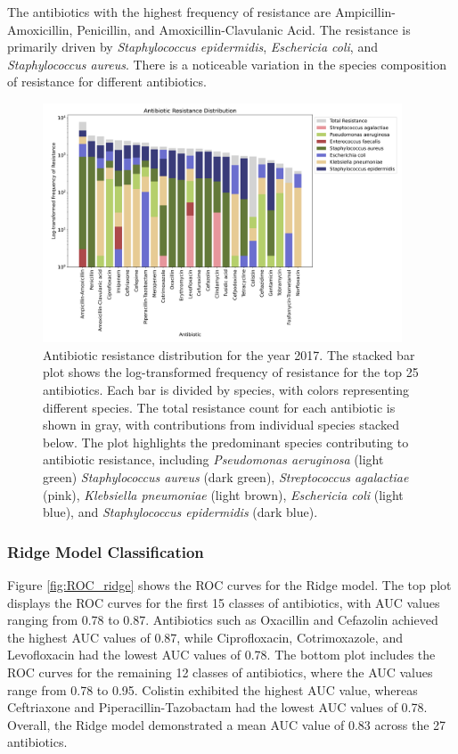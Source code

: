 \documentclass[english,11pt,a4paper,titlepage]{article}
\begin{document}
The antibiotics with the highest frequency of resistance are Ampicillin-Amoxicillin, Penicillin, and Amoxicillin-Clavulanic Acid. The resistance is primarily driven by \textit{Staphylococcus epidermidis}, \textit{Eschericia coli}, and \textit{Staphylococcus aureus}. There is a noticeable variation in the species composition of resistance for different antibiotics.

\begin{figure}[h]
	\centering
	\includegraphics[width=0.95\textwidth]{img/antibiotic_resistance_distribution_filtered_2017.png}
	\caption{Antibiotic resistance distribution for the year 2017. The stacked bar plot shows the log-transformed frequency of resistance for the top 25 antibiotics. Each bar is divided by species, with colors representing different species. The total resistance count for each antibiotic is shown in gray, with contributions from individual species stacked below. The plot highlights the predominant species contributing to antibiotic resistance, including \textit{Pseudomonas aeruginosa} (light green) \textit{Staphylococcus aureus} (dark green), \textit{Streptococcus agalactiae} (pink), \textit{Klebsiella pneumoniae} (light brown), \textit{Eschericia coli} (light blue), and \textit{Staphylococcus epidermidis} (dark blue).}
	\label{fig:antibiotic_resistance_distribution}
\end{figure}

\subsubsection*{Ridge Model Classification}
Figure \ref{fig:ROC_ridge} shows the ROC curves for the Ridge model. The top plot displays the ROC curves for the first 15 classes of antibiotics, with AUC values ranging from 0.78 to 0.87. Antibiotics such as Oxacillin and Cefazolin achieved the highest AUC values of 0.87, while Ciprofloxacin, Cotrimoxazole, and Levofloxacin had the lowest AUC values of 0.78. The bottom plot includes the ROC curves for the remaining 12 classes of antibiotics, where the AUC values range from 0.78 to 0.95. Colistin exhibited the highest AUC value, whereas Ceftriaxone and Piperacillin-Tazobactam had the lowest AUC values of 0.78. Overall, the Ridge model demonstrated a mean AUC value of 0.83 across the 27 antibiotics.
\end{document}

